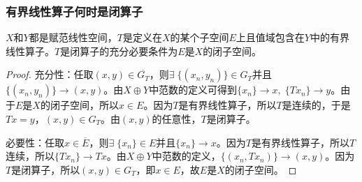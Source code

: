 \subsubsection{有界线性算子何时是闭算子}
\begin{theorem}
	$X$和$Y$都是赋范线性空间，$T$是定义在$X$的某个子空间$E$上且值域包含在$Y$中的有界线性算子。$T$是闭算子的充分必要条件为$E$是$X$的闭子空间。
\end{theorem}
\begin{proof}
	充分性：任取$(x,y)\in\overline{G_T}$，则$\exists\;\{(x_n,y_n)\}\in G_T$并且$\{(x_n,y_n)\}\to (x,y)$。由$X\oplus Y$中范数的定义可得到$\{x_n\}\to x,\;\{Tx_n\}\to y$。由于$E$是$X$的闭子空间，所以$x\in E$。因为$T$是有界线性算子，所以$T$是连续的，于是$Tx=y$，$(x,y)\in G_T$。由$(x,y)$的任意性，$T$是闭算子。\par
	必要性：任取$x\in\overline{E}$，则$\exists\;\{x_n\}\in E$并且$\{x_n\}\to x$。因为$T$是有界线性算子，所以$T$连续，所以$\{Tx_n\}\to Tx$。由$X\oplus Y$中范数的定义，$\{(x_n,Tx_n)\}\to(x,y)$。因为$T$是闭算子，所以$(x,y)\in G_T$，即$x\in E$，故$E$是$X$的闭子空间。
\end{proof}
